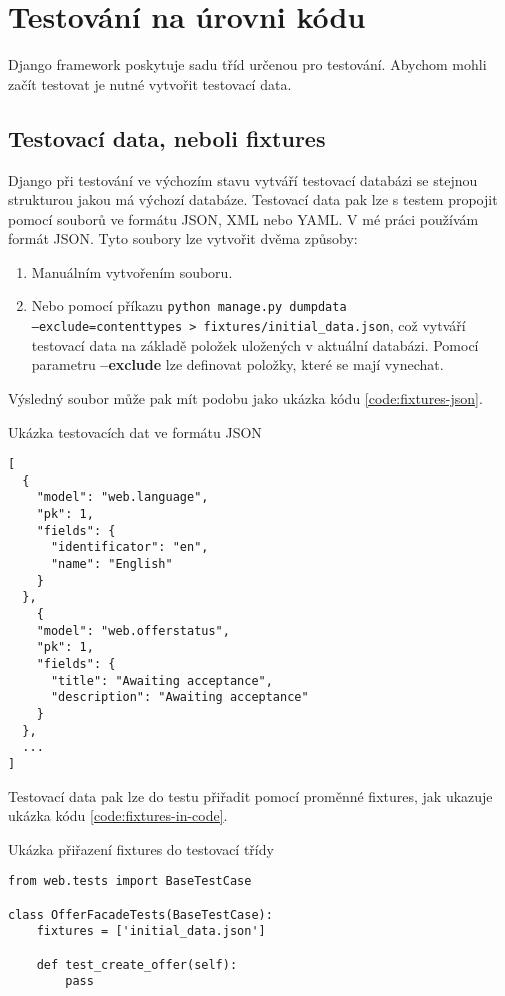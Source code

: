 \section{Testování na úrovni kódu}
Django framework poskytuje sadu tříd určenou pro testování. Abychom mohli začít testovat je nutné vytvořit testovací data.

\subsection{Testovací data, neboli fixtures}
Django při testování ve výchozím stavu vytváří testovací databázi se stejnou strukturou jakou má výchozí databáze. Testovací data pak lze s testem propojit pomocí souborů ve formátu JSON, XML nebo YAML. V mé práci používám formát JSON. Tyto soubory lze vytvořit dvěma způsoby:

\begin{enumerate}
    \item Manuálním vytvořením souboru.
    \item Nebo pomocí příkazu \texttt{python manage.py dumpdata \\--exclude=contenttypes > fixtures/initial\_data.json}, což vytváří testovací data na základě položek uložených v aktuální databázi. Pomocí parametru \textbf{--exclude} lze definovat položky, které se mají vynechat.
\end{enumerate}

Výsledný soubor může pak mít podobu jako ukázka kódu \ref{code:fixtures-json}.

\begin{listing}[h]
\caption{\label{code:fixtures-json}Ukázka testovacích dat ve formátu JSON}
\begin{verbatim}
[
  {
    "model": "web.language",
    "pk": 1,
    "fields": {
      "identificator": "en",
      "name": "English"
    }
  },
    {
    "model": "web.offerstatus",
    "pk": 1,
    "fields": {
      "title": "Awaiting acceptance",
      "description": "Awaiting acceptance"
    }
  },
  ...
]
\end{verbatim}
\end{listing}

Testovací data pak lze do testu přiřadit pomocí proměnné fixtures, jak ukazuje ukázka kódu \ref{code:fixtures-in-code}.

\begin{listing}[h]
\caption{\label{code:fixtures-in-code}Ukázka přiřazení fixtures do testovací třídy}
\begin{verbatim}
from web.tests import BaseTestCase

class OfferFacadeTests(BaseTestCase):
    fixtures = ['initial_data.json']

    def test_create_offer(self):
        pass
\end{verbatim}
\end{listing}

